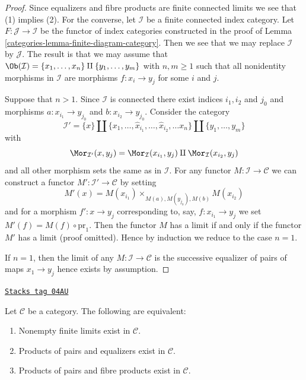 \begin{proof}

Since equalizers and fibre products are finite connected
limits we see that (1) implies (2). For the converse, let $\mathcal{I}$
be a finite connected index category. Let
$F : \mathcal{J} \to \mathcal{I}$
be the functor of index categories constructed in the proof of
Lemma \ref{categories-lemma-finite-diagram-category}.
Then we see that we may replace $\mathcal{I}$ by $\mathcal{J}$.
The result is that we may assume that
$\Ob(\mathcal{I}) = \{x_1, \ldots, x_n\} \amalg \{y_1, \ldots, y_m\}$
with $n, m \geq 1$ such that all nonidentity morphisms in $\mathcal{I}$
are morphisms $f : x_i \to y_j$ for some $i$ and $j$.

\medskip\noindent
Suppose that $n > 1$. Since $\mathcal{I}$ is connected there
exist indices $i_1, i_2$ and $j_0$ and morphisms $a : x_{i_1} \to y_{j_0}$
and $b : x_{i_2} \to y_{j_0}$. Consider the category
$$
\mathcal{I}' =
\{x\} \amalg \{x_1, \ldots, \hat x_{i_1}, \ldots, \hat x_{i_2}, \ldots x_n\}
\amalg \{y_1, \ldots, y_m\}
$$
with
$$
\Mor_{\mathcal{I}'}(x, y_j) = \Mor_\mathcal{I}(x_{i_1}, y_j)
\amalg \Mor_\mathcal{I}(x_{i_2}, y_j)
$$
and all other morphism sets the same as in $\mathcal{I}$. For any functor
$M : \mathcal{I} \to \mathcal{C}$ we can construct a functor
$M' : \mathcal{I}' \to \mathcal{C}$ by setting
$$
M'(x) = M(x_{i_1}) \times_{M(a), M(y_{j_0}), M(b)} M(x_{i_2})
$$
and for a morphism $f' : x \to y_j$ corresponding to, say,
$f : x_{i_1} \to y_j$ we set $M'(f) = M(f) \circ \text{pr}_1$.
Then the functor $M$ has a limit if and only if the functor $M'$ has
a limit (proof omitted). Hence by induction we reduce to the case $n = 1$.

\medskip\noindent
If $n = 1$, then the limit of any $M : \mathcal{I} \to \mathcal{C}$ is
the successive equalizer of pairs of maps $x_1 \to y_j$ hence
exists by assumption.
\end{proof}

\begin{lemma}
\label{categories-lemma-almost-finite-limits-exist}
\href{https://stacks.math.columbia.edu/tag/04AU}{\texttt{Stacks tag 04AU}}

Let $\mathcal{C}$ be a category.
The following are equivalent:
\begin{enumerate}
\item Nonempty finite limits exist in $\mathcal{C}$.
\item Products of pairs and equalizers exist in $\mathcal{C}$.
\item Products of pairs and fibre products exist in $\mathcal{C}$.
\end{enumerate}
\end{lemma}

